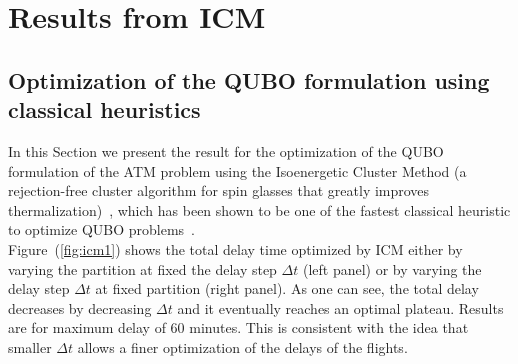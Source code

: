 \section{Results from ICM}
\subsection{Optimization of the QUBO formulation using classical heuristics}

In this Section we present the result for the optimization of the QUBO
formulation of the ATM problem using the Isoenergetic Cluster Method (a
rejection-free cluster algorithm for spin glasses that greatly improves
thermalization)~\cite{zhu2015}, which has been shown to be one of the fastest
classical heuristic to optimize QUBO problems~\cite{mandra2016}.\\

Figure~(\ref{fig:icm1}) shows the total delay time optimized by ICM either by 
varying the partition at fixed the delay step $\Delta t$ (left panel) or by
varying the delay step $\Delta t$ at fixed partition (right panel). As one can
see, the total delay decreases by decreasing $\Delta t$ and it eventually
reaches an optimal plateau. Results are for maximum delay of 60 minutes. This is
consistent with the idea that smaller $\Delta t$ allows a finer optimization of
the delays of the flights.\\

